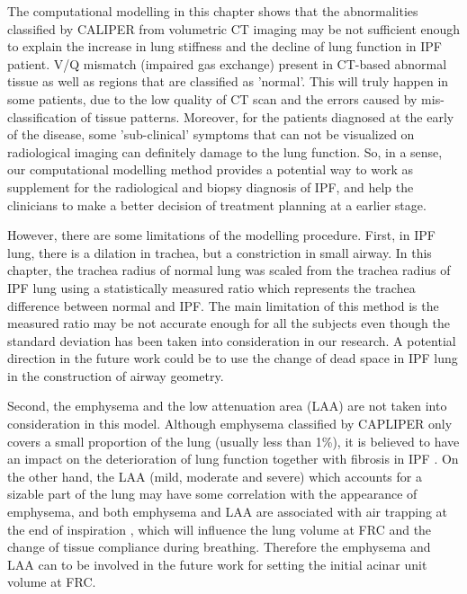 The computational modelling in this chapter shows that the abnormalities classified by CALIPER from volumetric CT imaging may be not sufficient enough to explain the increase in lung stiffness and the decline of lung function in IPF patient. V/Q mismatch (impaired gas exchange) present in CT-based abnormal tissue as well as regions that are classified as 'normal'. This will truly happen in some patients, due to the low quality of CT scan and the errors caused by mis-classification of tissue patterns. Moreover, for the patients diagnosed at the early of the disease, some 'sub-clinical' symptoms that can not be visualized on radiological imaging can definitely damage to the lung function. So, in a sense, our computational modelling method provides a potential way to work as supplement for the radiological and biopsy diagnosis of IPF, and help the clinicians to make a better decision of treatment planning at a earlier stage. 

However, there are some limitations of the modelling procedure. First, in IPF lung, there is a dilation in trachea, but a constriction in small airway. In this chapter, the trachea radius of normal lung was scaled from the trachea radius of IPF lung using a statistically measured ratio which represents the trachea difference between normal and IPF. The main limitation of this method is the measured ratio may be not accurate enough for all the subjects even though the standard deviation has been taken into consideration in our research. A potential direction in the future work could be to use the change of dead space in IPF lung in the construction of airway geometry. 

Second, the emphysema and the low attenuation area (LAA) are not taken into consideration in this model. Although emphysema classified by CAPLIPER only covers a small proportion of the lung (usually less than 1\%), it is believed to have an impact on the deterioration of lung function together with fibrosis in IPF \citep{cottin2005combined, king2011idiopathic, lin2015combined}. On the other hand, the LAA (mild, moderate and severe) which accounts for a sizable part of the lung may have some correlation with the appearance of emphysema, and both emphysema and LAA are associated with air trapping at the end of inspiration \cite{slebos2015air, hoesein2017air}, which will influence the lung volume at FRC and the change of tissue compliance during breathing. Therefore the emphysema and LAA can to be involved in the future work for setting the initial acinar unit volume at FRC. 

